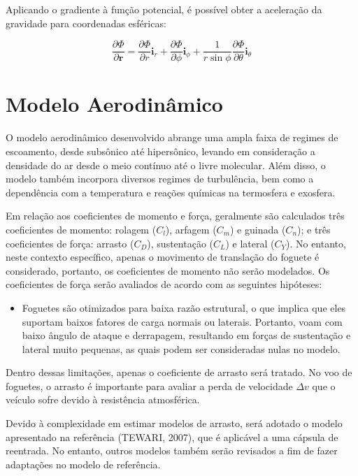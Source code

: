 Aplicando o gradiente à função potencial, é possível obter a aceleração da gravidade para coordenadas esféricas:

\begin{equation}
\frac{\partial \Phi}{\partial \mathbf{r}} = \frac{\partial \Phi}{\partial r} \mathbf{i}_r + \frac{\partial \Phi}{\partial \phi} \mathbf{i}_\phi + \frac{1}{r\sin \phi}\frac{\partial \Phi}{\partial \theta} \mathbf{i}_\theta
\end{equation}

\section{Modelo Aerodinâmico}

O modelo aerodinâmico desenvolvido abrange uma ampla faixa de regimes de escoamento, desde subsônico até hipersônico, levando em consideração a densidade do ar desde o meio contínuo até o livre molecular. Além disso, o modelo também incorpora diversos regimes de turbulência, bem como a dependência com a temperatura e reações químicas na termosfera e exosfera.

Em relação aos coeficientes de momento e força, geralmente são calculados três coeficientes de momento: rolagem ($C_{l}$), arfagem ($C_{m}$) e guinada ($C_{n}$); e três coeficientes de força: arrasto ($C_{D}$), sustentação ($C_{L}$) e lateral ($C_{Y}$). No entanto, neste contexto específico, apenas o movimento de translação do foguete é considerado, portanto, os coeficientes de momento não serão modelados. Os coeficientes de força serão avaliados de acordo com as seguintes hipóteses:

\begin{itemize}
    \item Foguetes são otimizados para baixa razão estrutural, o que implica que eles suportam baixos fatores de carga normais ou laterais. Portanto, voam com baixo ângulo de ataque e derrapagem, resultando em forças de sustentação e lateral muito pequenas, as quais podem ser consideradas nulas no modelo.
\end{itemize}

Dentro dessas limitações, apenas o coeficiente de arrasto será tratado. No voo de foguetes, o arrasto é importante para avaliar a perda de velocidade $\Delta v$ que o veículo sofre devido à resistência atmosférica.

Devido à complexidade em estimar modelos de arrasto, será adotado o modelo apresentado na referência (TEWARI, 2007), que é aplicável a uma cápsula de reentrada. No entanto, outros modelos também serão revisados a fim de fazer adaptações no modelo de referência.

